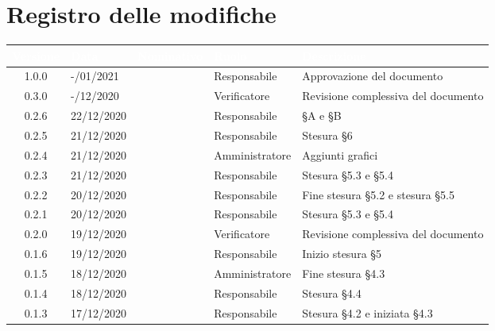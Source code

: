 \section*{Registro delle modifiche}
{
\renewcommand{\arraystretch}{1.5}
\centering
\begin{longtable}{c C{2.6cm} C{3cm} C{2.6cm} C{5cm}}
\textcolor{white}{\textbf{Versione}}&
\textcolor{white}{\textbf{Data}}&
\textcolor{white}{\textbf{Nominativo}}&
\textcolor{white}{\textbf{Ruolo}}&
\textcolor{white}{\textbf{Descrizione}}\\	
\endhead

1.0.0 & -/01/2021 & \SG{} & Responsabile & Approvazione del documento \\

0.3.0 & -/12/2020 & \SH{} & Verificatore & Revisione complessiva del documento \\

0.2.6 & 22/12/2020 & \BM{} & Responsabile & \S A e \S B \\

0.2.5 & 21/12/2020 & \BM{} & Responsabile & Stesura \S 6\\

0.2.4 & 21/12/2020 & \SG{} & Amministratore & Aggiunti grafici \\

0.2.3 & 21/12/2020 & \BM{} & Responsabile & Stesura \S 5.3 e \S 5.4\\

0.2.2 & 20/12/2020 & \SG{} & Responsabile & Fine stesura \S 5.2 e stesura \S 5.5 \\

0.2.1 & 20/12/2020 & \BM{} & Responsabile & Stesura \S 5.3 e \S 5.4\\

0.2.0 & 19/12/2020 & \ZM{} & Verificatore & Revisione complessiva del documento \\

0.1.6 & 19/12/2020 & \SG{} & Responsabile & Inizio stesura \S 5 \\

0.1.5 & 18/12/2020 & \PA{} & Amministratore & Fine stesura \S 4.3\\

0.1.4 & 18/12/2020 & \SG{} & Responsabile & Stesura \S 4.4 \\

0.1.3 & 17/12/2020 & \BM{} & Responsabile & Stesura \S 4.2 e iniziata \S 4.3 \\


\end{longtable}}
